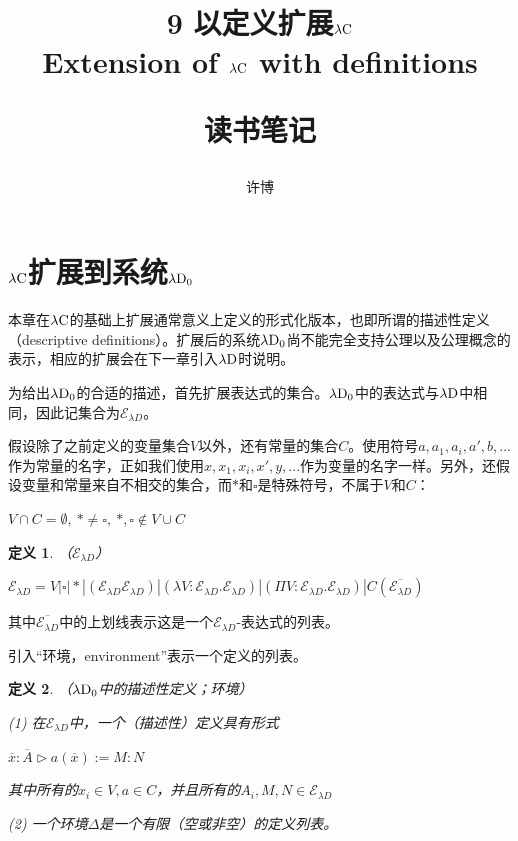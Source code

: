 \documentclass[UTF8]{article}
\title{9 以定义扩展$\lambda{\rm C}$\\Extension of $\lambda{\rm C}$ with definitions\\[2ex]\begin{large}读书笔记\end{large}}
\author{许博}
\date{}
\newtheorem{thm}{定义}[section]
\begin{document}
\maketitle
	\section{$\lambda{\rm C}$扩展到系统$\lambda{\rm D_0}$}
	\noindent
	本章在$\lambda{\rm C}$的基础上扩展通常意义上定义的形式化版本，也即所谓的描述性定义（descriptive definitions）。扩展后的系统$\lambda{\rm D_0}$尚不能完全支持公理以及公理概念的表示，相应的扩展会在下一章引入$\lambda{\rm D}$时说明。
	
		为给出$\lambda{\rm D_0}$的合适的描述，首先扩展表达式的集合。$\lambda{\rm D_0}$中的表达式与$\lambda{\rm D}$中相同，因此记集合为$\mathcal{E}_{\lambda{D}}$。
		
		假设除了之前定义的变量集合$V$以外，还有常量的集合$C$。使用符号$a,a_1,a_i,a',b,...$作为常量的名字，正如我们使用$x,x_1,x_i,x',y,...$作为变量的名字一样。另外，还假设变量和常量来自不相交的集合，而$*$和$\square$是特殊符号，不属于$V$和$C$：
		
		$V\cap C=\emptyset,\ *\not=\square,\ *,\square\notin V\cup C$
		
		\begin{thm}（$\mathcal{E}_{\lambda{D}}$）
			
			$\mathcal{E}_{\lambda{D}}=V|\square|*|(\mathcal{E}_{\lambda{D}}\mathcal{E}_{\lambda{D}})|(\lambda V:\mathcal{E}_{\lambda{D}}.\mathcal{E}_{\lambda{D}})|(\Pi V:\mathcal{E}_{\lambda{D}}.\mathcal{E}_{\lambda{D}})|C(\overline{\mathcal{E}_{\lambda{D}}})$
		\end{thm}
	
		其中$\overline{\mathcal{E}_{\lambda{D}}}$中的上划线表示这是一个$\mathcal{E}_{\lambda{D}}$-表达式的列表。
		
		引入“环境，environment”表示一个定义的列表。
		
		\begin{thm}（$\lambda{\rm D_0}$中的描述性定义；环境）
			
			\noindent
			(1) 在$\mathcal{E}_{\lambda{D}}$中，一个（描述性）定义具有形式
			
			$\overline{x}:\overline{A}\triangleright a(\overline{x}):=M:N$
			
			\noindent
			其中所有的$x_i\in V,a\in C$，并且所有的$A_i,M,N\in\mathcal{E}_{\lambda{D}}$
			
			\noindent
			(2) 一个环境$\Delta$是一个有限（空或非空）的定义列表。
		\end{thm}
	
\end{document}
